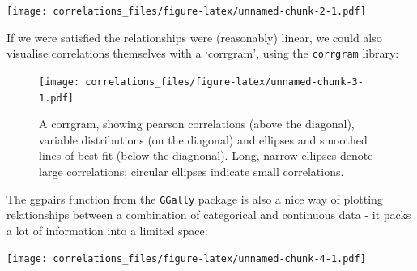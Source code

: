 \documentclass[]{article}
\newenvironment{Shaded}{\begin{snugshade}}{\end{snugshade}}
\newcommand{\KeywordTok}[1]{\textcolor[rgb]{0.13,0.29,0.53}{\textbf{#1}}}
\newcommand{\DataTypeTok}[1]{\textcolor[rgb]{0.13,0.29,0.53}{#1}}
\newcommand{\StringTok}[1]{\textcolor[rgb]{0.31,0.60,0.02}{#1}}
\newcommand{\OperatorTok}[1]{\textcolor[rgb]{0.81,0.36,0.00}{\textbf{#1}}}
\newcommand{\NormalTok}[1]{#1}
\theoremstyle{definition}
\theoremstyle{definition}
\theoremstyle{definition}
\theoremstyle{remark}
\begin{document}
\texttt{[image: correlations\_files/figure-latex/unnamed-chunk-2-1.pdf]}

If we were satisfied the relationships were (reasonably) linear, we
could also visualise correlations themselves with a `corrgram', using
the \texttt{corrgram} library:

\begin{Shaded}
\end{Shaded}

\begin{figure}
\centering
\texttt{[image: correlations\_files/figure-latex/unnamed-chunk-3-1.pdf]}
\caption{\label{fig:unnamed-chunk-3}A corrgram, showing pearson correlations
(above the diagonal), variable distributions (on the diagonal) and
ellipses and smoothed lines of best fit (below the diagnonal). Long,
narrow ellipses denote large correlations; circular ellipses indicate
small correlations.}
\end{figure}

The ggpairs function from the \texttt{GGally} package is also a nice way
of plotting relationships between a combination of categorical and
continuous data - it packs a lot of information into a limited space:

\begin{Shaded}
\end{Shaded}

\texttt{[image: correlations\_files/figure-latex/unnamed-chunk-4-1.pdf]}
\end{document}
